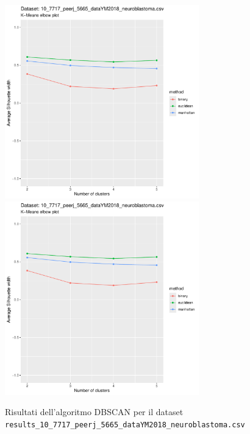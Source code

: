 \documentclass[12pt]{report}
\begin{document}
			\begin{figure}[h]
				\centering
				\includegraphics[width = 0.75\textwidth, height = 0.45\textheight, page = 5]{
					results/results_10_7717_peerj_5665_dataYM2018_neuroblastoma.csv.pdf
				}
				\includegraphics[width = 0.75\textwidth, height = 0.45\textheight, page = 6]{
					results/results_10_7717_peerj_5665_dataYM2018_neuroblastoma.csv.pdf
				}
				\caption{Risultati dell'algoritmo DBSCAN per il dataset
				\texttt{results\_10\_7717\_peerj\_5665\_dataYM2018\_neuroblastoma.csv}}
				\label{fig:dbscan3}
			\end{figure}
\end{document}

